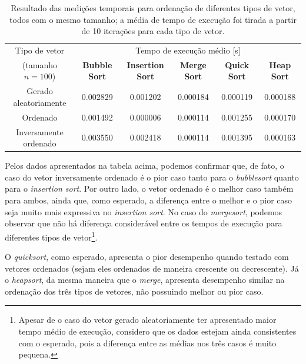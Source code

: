 \documentclass[fontsize=10pt]{article}
\begin{document}
\begin{table}[ht]
\centering
\begin{tabular}{@{}c|ccccc@{}}
Tipo de vetor         & \multicolumn{5}{c}{Tempo de execução médio {[}s{]}}                                                             \\
(tamanho $n = 100$)   & \textbf{Bubble Sort} & \textbf{Insertion Sort} & \textbf{Merge Sort} & \textbf{Quick Sort} & \textbf{Heap Sort} \\ \midrule
Gerado aleatoriamente & 0.002829             & 0.001202                & 0.000184            & 0.000119            & 0.000188           \\
Ordenado              & 0.001492             & 0.000006                & 0.000114            & 0.001255            & 0.000170           \\
Inversamente ordenado & 0.003550             & 0.002418                & 0.000114            & 0.001395            & 0.000163          
\end{tabular}
\caption{Resultado das medições temporais para ordenação de diferentes tipos de vetor, todos com o mesmo tamanho; a média de tempo de execução foi tirada a partir de 10 iterações para cada tipo de vetor.}
\label{Tabela 3}
\end{table}

\quad Pelos dados apresentados na tabela acima, podemos confirmar que, de fato, o caso do vetor inversamente ordenado é o pior caso tanto para o \textit{bubblesort} quanto para o \textit{insertion sort}. Por outro lado, o vetor ordenado é o melhor caso também para ambos, ainda que, como esperado, a diferença entre o melhor e o pior caso seja muito mais expressiva no \textit{insertion sort}. No caso do \textit{mergesort}, podemos observar que não há diferença considerável entre os tempos de execução para diferentes tipos de vetor\footnote{Apesar de o caso do vetor gerado aleatoriamente ter apresentado maior tempo médio de execução, considero que os dados estejam ainda consistentes com o esperado, pois a diferença entre as médias nos três casos é muito pequena.}.

\quad O \textit{quicksort}, como esperado, apresenta o pior desempenho quando testado com vetores ordenados (sejam eles ordenados de maneira crescente ou decrescente). Já o \textit{heapsort}, da mesma maneira que o \textit{merge}, apresenta desempenho similar na ordenação dos três tipos de vetores, não possuindo melhor ou pior caso.

\end{document}
